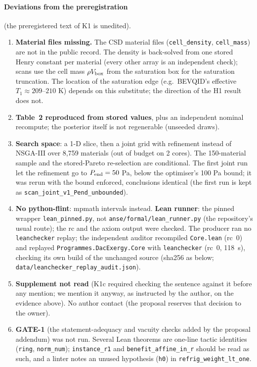 \documentclass[10pt]{article}
\newcommand{\lean}[1]{\texttt{#1}}
\begin{document}
\paragraph{Deviations from the preregistration} (the preregistered text of K1 is unedited).
\begin{enumerate}\itemsep=0pt
\item \textbf{Material files missing.} The CSD material files (\texttt{cell\_density}, \texttt{cell\_mass}) are not in the public record. The density is back-solved from one stored Henry constant per material (every other array is an independent check); scans use the cell mass $\rho V_{\rm box}$ from the saturation box for the saturation truncation. The location of the saturation edge (e.g.\ BEVQID's effective $T_1\approx209$--$210$ K) depends on this substitute; the direction of the H1 result does not.
\item \textbf{Table~2 reproduced from stored values}, plus an independent nominal recompute; the posterior itself is not regenerable (unseeded draws).
\item \textbf{Search space}: a 1-D slice, then a joint grid with refinement instead of NSGA-III over 8,759 materials (out of budget on 2 cores). The 150-material sample and the stored-Pareto re-selection are conditional. The first joint run let the refinement go to $P_{\rm end}=50$ Pa, below the optimiser's 100 Pa bound; it was rerun with the bound enforced, conclusions identical (the first run is kept as \texttt{scan\_joint\_v1\_Pend\_unbounded}).
\item \textbf{No python-flint}: mpmath intervals instead. \textbf{Lean runner}: the pinned wrapper \texttt{lean\_pinned.py}, not \texttt{anse/formal/lean\_runner.py} (the repository's usual route); the rc and the axiom output were checked. The producer ran no \texttt{leanchecker} replay; the independent auditor recompiled \texttt{Core.lean} (rc~0) and replayed \texttt{Programmes.DacExergy.Core} with \texttt{leanchecker} (rc~0, 118~s), checking its own build of the unchanged source (sha256 as below; \texttt{data/leanchecker\_replay\_audit.json}).
\item \textbf{Supplement not read} (K1c required checking the sentence against it before any mention; we mention it anyway, as instructed by the author, on the evidence above). No author contact (the proposal reserves that decision to the owner).
\item \textbf{GATE-1} (the statement-adequacy and vacuity checks added by the proposal addendum) was not run. Several Lean theorems are one-line tactic identities (\lean{ring}, \lean{norm\_num}); \lean{instance\_r1} and \lean{benefit\_affine\_in\_r} should be read as such, and a linter notes an unused hypothesis (\lean{h0}) in \lean{refrig\_weight\_lt\_one}.

\end{enumerate}
\end{document}

